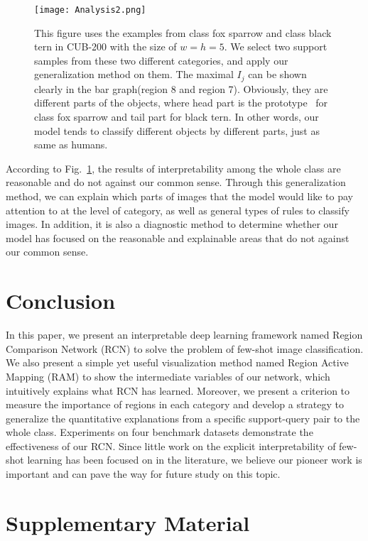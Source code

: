 \documentclass[letterpaper]{article}
\begin{document}
\begin{figure}
    \centering
    \texttt{[image: Analysis2.png]}
    \caption{This figure uses the examples from class fox sparrow and class black tern in CUB-200 with the size of $w=h=5$. We select two support samples from these two different categories, and apply our generalization method on them. The maximal $I_{j}$ can be shown clearly in the bar graph(region 8 and region 7). Obviously, they are different parts of the objects, where head part is the prototype~\cite{Chen2018ThisLL} for class fox sparrow and tail part for black tern. In other words, our model tends to classify different objects by different parts, just as same as humans.}
    \label{Fig:Analysis}
\end{figure}

According to Fig.~\ref{Fig:Analysis}, the results of interpretability among the whole class are reasonable and do not against our common sense. Through this generalization method, we can explain which parts of images that the model would like to pay attention to at the level of category, as well as general types of rules to classify images. In addition, it is also a diagnostic method to determine whether our model has focused on the reasonable and explainable areas that do not against our common sense. 

\section{Conclusion}
In this paper, we present an interpretable deep learning framework named Region Comparison Network (RCN) to solve the problem of few-shot image classification. We also present a simple yet useful visualization method named Region Active Mapping (RAM) to show the intermediate variables of our network, which intuitively explains what RCN has learned. Moreover, we present a criterion to measure the importance of regions in each category and develop a strategy to generalize the quantitative explanations from a specific support-query pair to the whole class. Experiments on four benchmark datasets demonstrate the effectiveness of our RCN. Since little work on the explicit interpretability of few-shot learning has been focused on in the literature, we believe our pioneer work is important and can pave the way for future study on this topic. 





\newpage
\section{Supplementary Material}
\end{document}
